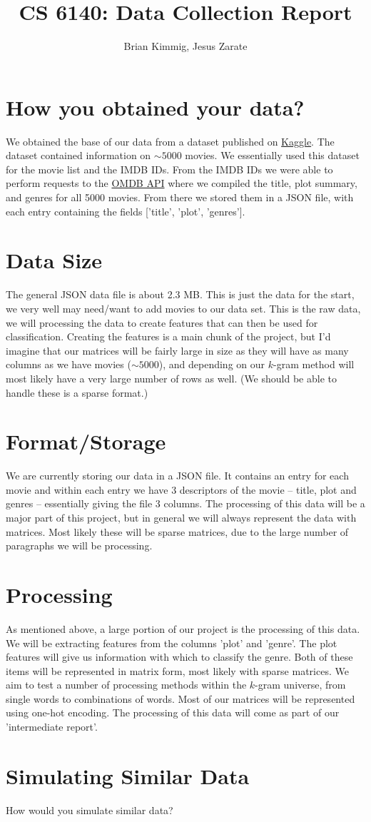 \documentclass[12pt]{article}
\title{CS 6140: Data Collection Report}
\author{Brian Kimmig, Jesus Zarate}
\date{}
\begin{document}
\maketitle

\section{How you obtained your data?}

We obtained the base of our data from a dataset published on \href{https://www.kaggle.com/deepmatrix/imdb-5000-movie-dataset}{Kaggle}. The dataset contained information on $\sim5000$ movies. We essentially used this dataset for the movie list and the IMDB IDs. From the IMDB IDs we were able to perform requests to the  \href{https://www.omdbapi.com/}{OMDB API} where we compiled the title, plot summary, and genres for all 5000 movies. From there we stored them in a JSON file, with each entry containing the fields ['title', 'plot', 'genres'].

\section{Data Size}
The general JSON data file is about 2.3 MB. This is just the data for the start, we very well may need/want to add movies to our data set. This is the raw data, we will processing the data to create features that can then be used for classification. Creating the features is a main chunk of the project, but I'd imagine that our matrices will be fairly large in size as they will have as many columns as we have movies ($\sim5000$), and depending on our $k$-gram method will most likely have a very large number of rows as well. (We should be able to handle these is a sparse format.) 

\section{Format/Storage}
We are currently storing our data in a JSON file. It contains an entry for each movie and within each entry we have 3 descriptors of the movie -- title, plot and genres -- essentially giving the file 3 columns. The processing of this data will be a major part of this project, but in general we will always represent the data with matrices. Most likely these will be sparse matrices, due to the large number of paragraphs we will be processing.

\section{Processing}
As mentioned above, a large portion of our project is the processing of this data. We will be extracting features from the columns 'plot' and 'genre'. The plot features will give us information with which to classify the genre. Both of these items will be represented in matrix form, most likely with sparse matrices. We aim to test a number of processing methods within the $k$-gram universe, from single words to combinations of words. Most of our matrices will be represented using one-hot encoding. The processing of this data will come as part of our 'intermediate report'. 

\section{Simulating Similar Data}
How would you simulate similar data?
\end{document}
